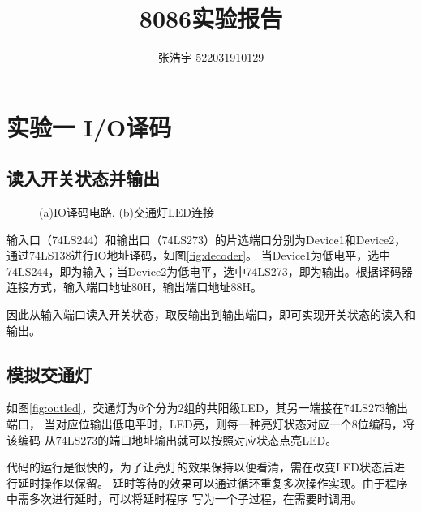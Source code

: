 \documentclass[12pt, a4paper, oneside]{ctexart}
\title{\textbf{8086实验报告}}
\author{张浩宇 522031910129}
\date{}
\begin{document}
    \maketitle
    \section{实验一 I/O译码}
    \subsection{读入开关状态并输出}
    \begin{figure}[!h]
        \centering
        \hfil
        \caption{(a)IO译码电路. (b)交通灯LED连接}
    \end{figure} 
    输入口（74LS244）和输出口（74LS273）的片选端口分别为Device1和Device2，通过74LS138进行IO地址译码，如图{\ref{fig:decoder}}。
    当Device1为低电平，选中74LS244，即为输入；当Device2为低电平，选中74LS273，即为输出。根据译码器连接方式，输入端口地址80H，输出端口地址88H。
    
    因此从输入端口读入开关状态，取反输出到输出端口，即可实现开关状态的读入和输出。
    \subsection{模拟交通灯}
    如图\ref{fig:outled}，交通灯为6个分为2组的共阳级LED，其另一端接在74LS273输出端口，
    当对应位输出低电平时，LED亮，则每一种亮灯状态对应一个8位编码，将该编码
    从74LS273的端口地址输出就可以按照对应状态点亮LED。

    代码的运行是很快的，为了让亮灯的效果保持以便看清，需在改变LED状态后进行延时操作以保留。
    延时等待的效果可以通过循环重复多次操作实现。由于程序中需多次进行延时，可以将延时程序
    写为一个子过程，在需要时调用。
\end{document}
